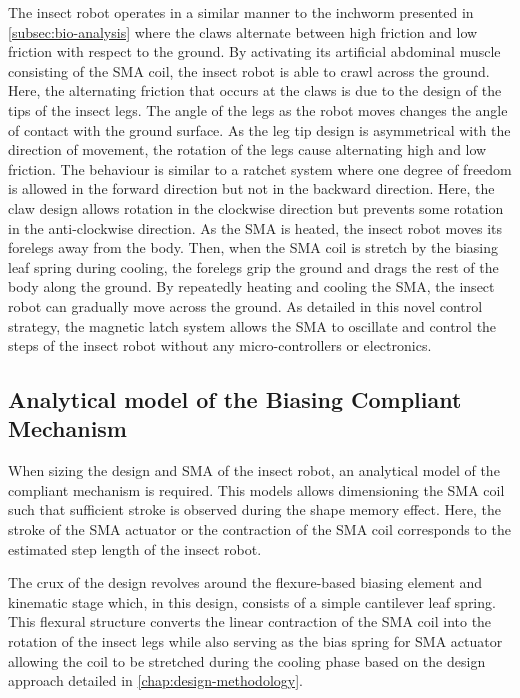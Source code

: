 The insect robot operates in a similar manner to the inchworm presented in \cref{subsec:bio-analysis} where the claws alternate between high friction and low friction with respect to the ground. By activating its artificial abdominal muscle consisting of the SMA coil, the insect robot is able to crawl across the ground. Here, the alternating friction that occurs at the claws is due to the design of the tips of the insect legs. The angle of the legs as the robot moves changes the angle of contact with the ground surface. As the leg tip design is asymmetrical with the direction of movement, the rotation of the legs cause alternating high and low friction. The behaviour is similar to a ratchet system where one degree of freedom is allowed in the forward direction but not in the backward direction. Here, the claw design allows rotation in the clockwise direction but prevents some rotation in the anti-clockwise direction. As the SMA is heated, the insect robot moves its forelegs away from the body. Then, when the SMA coil is stretch by the biasing leaf spring during cooling, the forelegs grip the ground and drags the rest of the body along the ground. By repeatedly heating and cooling the SMA, the insect robot can gradually move across the ground. As detailed in this novel control strategy, the magnetic latch system allows the SMA to oscillate and control the steps of the insect robot without any micro-controllers or electronics.

\subsection{Analytical model of the Biasing Compliant Mechanism}

When sizing the design and SMA of the insect robot, an analytical model of the compliant mechanism is required. This models allows dimensioning the SMA coil such that sufficient stroke is observed during the shape memory effect. Here, the stroke of the SMA actuator or the contraction of the SMA coil corresponds to the estimated step length of the insect robot.

The crux of the design revolves around the flexure-based biasing element and kinematic stage which, in this design, consists of a simple cantilever leaf spring. This flexural structure converts the linear contraction of the SMA coil into the rotation of the insect legs while also serving as the bias spring for SMA actuator allowing the coil to be stretched during the cooling phase based on the design approach detailed in \cref{chap:design-methodology}.

